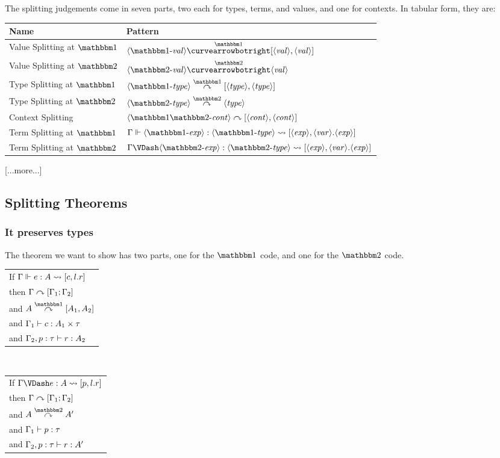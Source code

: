 \documentclass{article}
\begin{document}
The splitting judgements come in seven parts, two each for types, terms, and values, and one for contexts.  In tabular form, they are:
\begin{center}
\begin{tabular}{|l|l|} \hline
Name & Pattern \\ \hline
Value Splitting at $\bbone$& $\valo \vsplito [\val,\val]$ \\  \hline
Value Splitting at $\bbtwo$& $\valt \vsplits \val$ \\  \hline
Type Splitting at $\bbone$& $\typeo \tsplito [\type,\type]$ \\  \hline
Type Splitting at $\bbtwo$& $\typet \tsplits \type$ \\  \hline
Context Splitting & $\contextot \csplit [\context,\context]$ \\  \hline
Term Splitting at $\bbone$& $\splitone{\expro}{\typeo}{\expr,\var.\expr}$ \\  \hline
Term Splitting at $\bbtwo$& $\splittwo{\exprt}{\typet}{\expr,\var.\expr}$ \\  \hline
\end{tabular}
\end{center}

[...more...]





\subsection {Splitting Theorems}

\subsubsection{It preserves types}

The theorem we want to show has two parts, one for the $\bbone$ code, and one for the $\bbtwo$ code.  
\begin{center}
\begin{tabular}{l}
If $\splitone {e}{A}{c,l.r}$ \\
then $\Gamma \csplit [\Gamma_1;\Gamma_2]$ \\
and $A \tsplito [A_1,A_2]$ \\
and $ \types [\Gamma_1]{c} {A_1 \times \tau}$ \\
and $ \types [\Gamma_2, p:\tau]{r} {A_2}$ 
\end{tabular}
~~~
\begin{tabular}{l}
If $\splittwo {e}{A}{p,l.r}$ \\
then $\Gamma \csplit [\Gamma_1;\Gamma_2]$ \\
and $A \tsplits A'$ \\
and $ \types [\Gamma_1]{p} {\tau}$ \\
and $ \types [\Gamma_2, p:\tau]{r} {A'}$ 
\end{tabular}
\end{center}
\end{document}

